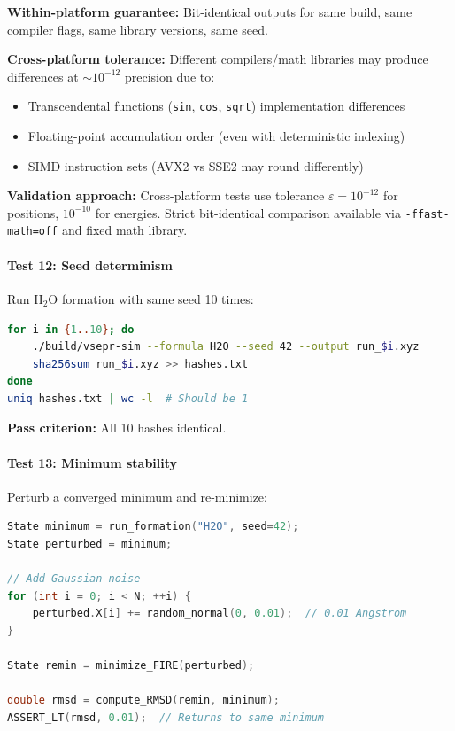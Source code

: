 \documentclass[11pt]{article}
\begin{document}
\textbf{Within-platform guarantee:} Bit-identical outputs for same build, same compiler flags, same library versions, same seed.

\textbf{Cross-platform tolerance:} Different compilers/math libraries may produce differences at $\sim 10^{-12}$ precision due to:
\begin{itemize}
\item Transcendental functions (\texttt{sin}, \texttt{cos}, \texttt{sqrt}) implementation differences
\item Floating-point accumulation order (even with deterministic indexing)
\item SIMD instruction sets (AVX2 vs SSE2 may round differently)
\end{itemize}

\textbf{Validation approach:} Cross-platform tests use tolerance $\varepsilon = 10^{-12}$ for positions, $10^{-10}$ for energies. Strict bit-identical comparison available via \texttt{-ffast-math=off} and fixed math library.

\paragraph{Test 12: Seed determinism}

Run H$_2$O formation with same seed 10 times:

\begin{lstlisting}[language=bash]
for i in {1..10}; do
    ./build/vsepr-sim --formula H2O --seed 42 --output run_$i.xyz
    sha256sum run_$i.xyz >> hashes.txt
done
uniq hashes.txt | wc -l  # Should be 1
\end{lstlisting}

\textbf{Pass criterion:} All 10 hashes identical.

\paragraph{Test 13: Minimum stability}

Perturb a converged minimum and re-minimize:

\begin{lstlisting}[language=C++]
State minimum = run_formation("H2O", seed=42);
State perturbed = minimum;

// Add Gaussian noise
for (int i = 0; i < N; ++i) {
    perturbed.X[i] += random_normal(0, 0.01);  // 0.01 Angstrom
}

State remin = minimize_FIRE(perturbed);

double rmsd = compute_RMSD(remin, minimum);
ASSERT_LT(rmsd, 0.01);  // Returns to same minimum
\end{lstlisting}
\end{document}
